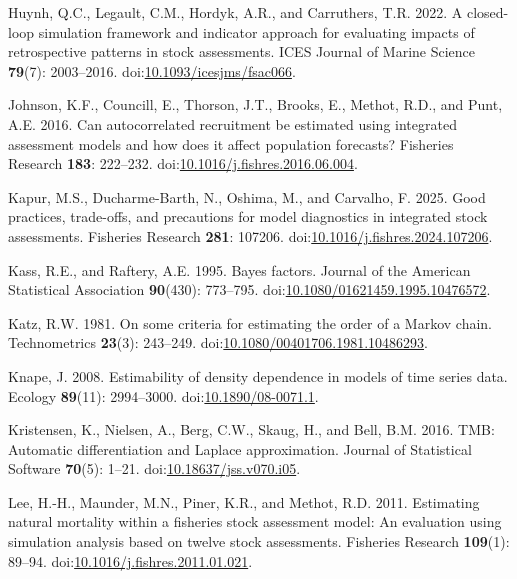 \documentclass[
  12pt,
]{article}
\newlength{\cslhangindent}
\newenvironment{CSLReferences}[2] %
 {\begin{list}{}{%
  \setlength{\itemindent}{0pt} %
  \setlength{\leftmargin}{0pt} %
  \setlength{\parsep}{0pt} %
  \ifodd #1
   \setlength{\leftmargin}{\cslhangindent} %
   \setlength{\itemindent}{-1\cslhangindent} %
  \fi
  \setlength{\itemsep}{#2\baselineskip}}} %
 {\end{list}} %
\begin{document}
\begin{CSLReferences}{1}{0}
Huynh, Q.C., Legault, C.M., Hordyk, A.R., and Carruthers, T.R. 2022. A
closed-loop simulation framework and indicator approach for evaluating
impacts of retrospective patterns in stock assessments. ICES Journal of
Marine Science \textbf{79}(7): 2003--2016.
doi:\href{https://doi.org/10.1093/icesjms/fsac066}{10.1093/icesjms/fsac066}.

Johnson, K.F., Councill, E., Thorson, J.T., Brooks, E., Methot, R.D.,
and Punt, A.E. 2016. Can autocorrelated recruitment be estimated using
integrated assessment models and how does it affect population
forecasts? Fisheries Research \textbf{183}: 222--232.
doi:\href{https://doi.org/10.1016/j.fishres.2016.06.004}{10.1016/j.fishres.2016.06.004}.

Kapur, M.S., Ducharme-Barth, N., Oshima, M., and Carvalho, F. 2025. Good
practices, trade-offs, and precautions for model diagnostics in
integrated stock assessments. Fisheries Research \textbf{281}: 107206.
doi:\href{https://doi.org/10.1016/j.fishres.2024.107206}{10.1016/j.fishres.2024.107206}.

Kass, R.E., and Raftery, A.E. 1995. Bayes factors. Journal of the
American Statistical Association \textbf{90}(430): 773--795.
doi:\href{https://doi.org/10.1080/01621459.1995.10476572}{10.1080/01621459.1995.10476572}.

Katz, R.W. 1981. On some criteria for estimating the order of a {M}arkov
chain. Technometrics \textbf{23}(3): 243--249.
doi:\href{https://doi.org/10.1080/00401706.1981.10486293}{10.1080/00401706.1981.10486293}.

Knape, J. 2008. Estimability of density dependence in models of time
series data. Ecology \textbf{89}(11): 2994--3000.
doi:\href{https://doi.org/10.1890/08-0071.1}{10.1890/08-0071.1}.

Kristensen, K., Nielsen, A., Berg, C.W., Skaug, H., and Bell, B.M. 2016.
{TMB}: Automatic differentiation and {L}aplace approximation. Journal of
Statistical Software \textbf{70}(5): 1--21.
doi:\href{https://doi.org/10.18637/jss.v070.i05}{10.18637/jss.v070.i05}.

Lee, H.-H., Maunder, M.N., Piner, K.R., and Methot, R.D. 2011.
Estimating natural mortality within a fisheries stock assessment model:
An evaluation using simulation analysis based on twelve stock
assessments. Fisheries Research \textbf{109}(1): 89--94.
doi:\href{https://doi.org/10.1016/j.fishres.2011.01.021}{10.1016/j.fishres.2011.01.021}.


\end{CSLReferences}
\end{document}
